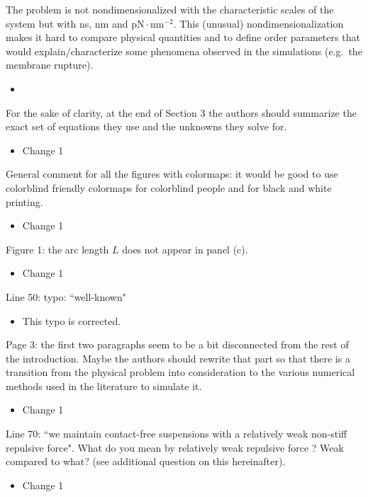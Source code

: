 \documentclass[11pt]{article}
\newcommand{\comment}[1]{{\color{blue} #1}}
\begin{document}
\noindent
\comment{The problem is not nondimensionalized with the characteristic
scales of the system but with ns, nm and $\text{pN} \cdot
\text{nm}^{-2}$. This (unusual) nondimensionalization makes it hard to
compare physical quantities and to define order parameters that would
explain/characterize some phenomena observed in the simulations
(e.g.~the membrane rupture).}

\begin{itemize}
  \item 
\end{itemize}

\noindent
\comment{For the sake of clarity, at the end of Section 3 the authors
should summarize the exact set of equations they use and the unknowns
they solve for.}
\begin{itemize}
  \item Change 1 
\end{itemize}

\noindent
\comment{General comment for all the figures with colormaps: it would be
good to use colorblind friendly colormaps for colorblind people and for
black and white printing.}
\begin{itemize}
  \item Change 1 
\end{itemize}

\noindent
\comment{Figure 1: the arc length $L$ does not appear in panel (c).}
\begin{itemize}
  \item Change 1 
\end{itemize}

\noindent
\comment{Line 50: typo: ``well-known"}
\begin{itemize}
  \item This typo is corrected.
\end{itemize}

\noindent
\comment{Page 3: the first two paragraphs seem to be a bit disconnected
from the rest of the introduction. Maybe the authors should rewrite that
part so that there is a transition from the physical problem into
consideration to the various numerical methods used in the literature to
simulate it.}
\begin{itemize}
  \item Change 1 
\end{itemize}

\noindent
\comment{Line 70: ``we maintain contact-free suspensions with a
relatively weak non-stiff repulsive force". What do you mean by
relatively weak repulsive force ? Weak compared to what? (see additional
question on this hereinafter).}
\begin{itemize}
  \item Change 1 
\end{itemize}
\end{document}
